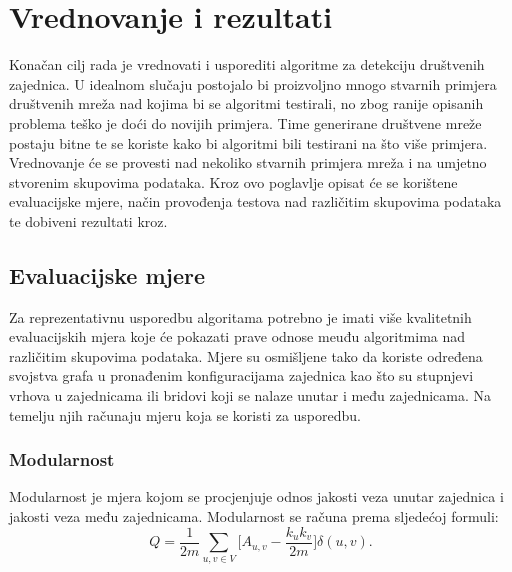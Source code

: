 \chapter{Vrednovanje i rezultati} \label{vrednovanja_i_rezultati}

Konačan cilj rada je vrednovati i usporediti algoritme za detekciju društvenih zajednica. U idealnom slučaju postojalo bi proizvoljno mnogo stvarnih primjera društvenih mreža nad kojima bi se algoritmi testirali, no zbog ranije opisanih problema teško je doći do novijih primjera. Time generirane društvene mreže postaju bitne te se koriste kako bi algoritmi bili testirani na što više primjera. Vrednovanje će se provesti nad nekoliko stvarnih primjera mreža i na umjetno stvorenim skupovima podataka. Kroz ovo poglavlje opisat će se korištene evaluacijske mjere, način provođenja testova nad različitim skupovima podataka te dobiveni rezultati kroz.

\section{Evaluacijske mjere}
Za reprezentativnu usporedbu algoritama potrebno je imati više kvalitetnih evaluacijskih mjera koje će pokazati prave odnose meuđu algoritmima nad različitim skupovima podataka. Mjere su osmišljene tako da koriste određena svojstva grafa u  pronađenim konfiguracijama zajednica kao što su stupnjevi vrhova u zajednicama ili bridovi koji se nalaze unutar i među zajednicama. Na temelju njih računaju mjeru koja se koristi za usporedbu. 


\subsection{Modularnost}
Modularnost je mjera kojom se procjenjuje odnos jakosti veza unutar zajednica i jakosti veza među zajednicama. Modularnost se računa prema sljedećoj formuli:
\begin{equation}
	Q = \frac{1}{2m} \sum_{u,v \in V} \bigg[ A_{u,v} - \frac{k_{u}k_{v}}{2m} \bigg] \delta(u,v).
\end{equation}

